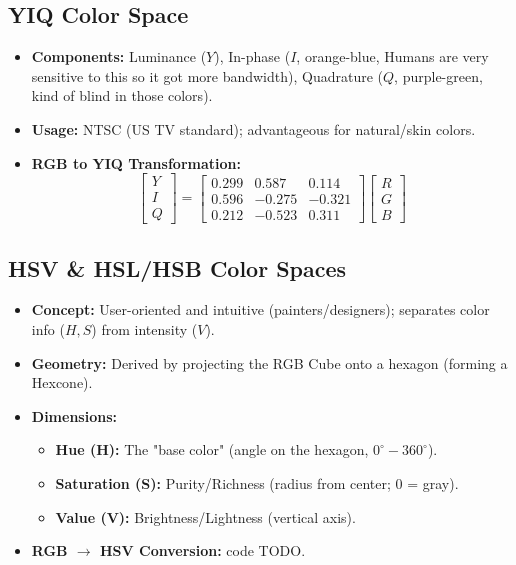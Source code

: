 \documentclass[a4paper,9pt]{article}
\begin{document}
\subsection{YIQ Color Space}
\begin{itemize}
    \item \textbf{Components:} Luminance ($Y$), In-phase ($I$, orange-blue, Humans are very sensitive to this so it got more bandwidth), Quadrature ($Q$, purple-green, kind of blind in those colors).
    \item \textbf{Usage:} NTSC (US TV standard); advantageous for natural/skin colors.
    \item \textbf{RGB to YIQ Transformation:}
    \[
    \begin{bmatrix} Y \\ I \\ Q \end{bmatrix} = 
    \begin{bmatrix} 
    0.299 & 0.587 & 0.114 \\ 
    0.596 & -0.275 & -0.321 \\ 
    0.212 & -0.523 & 0.311 
    \end{bmatrix} 
    \begin{bmatrix} R \\ G \\ B \end{bmatrix}
    \]
\end{itemize}
\subsection{HSV \& HSL/HSB Color Spaces}
\begin{itemize}
    \item \textbf{Concept:} User-oriented and intuitive (painters/designers); separates color info ($H, S$) from intensity ($V$).
    \item \textbf{Geometry:} Derived by projecting the RGB Cube onto a hexagon (forming a Hexcone).
    \item \textbf{Dimensions:}
    \begin{itemize}
        \item \textbf{Hue (H):} The "base color" (angle on the hexagon, $0^\circ-360^\circ$).
        \item \textbf{Saturation (S):} Purity/Richness (radius from center; $0$ = gray).
        \item \textbf{Value (V):} Brightness/Lightness (vertical axis).
    \end{itemize}
    \item \textbf{RGB $\to$  HSV Conversion:} code TODO.\\
\end{itemize}
\end{document}
